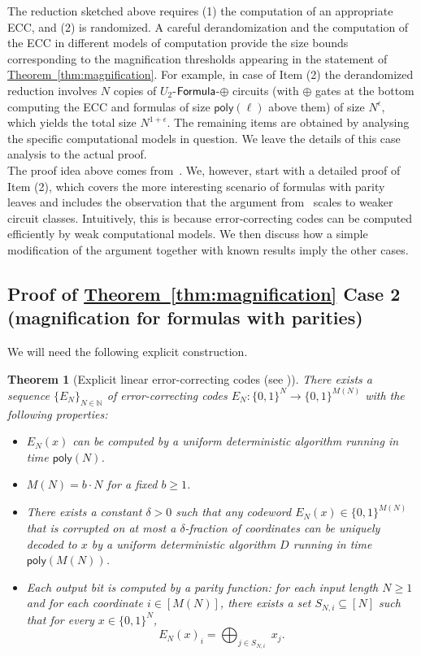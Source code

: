 \documentclass[11pt]{article}
\numberwithin{equation}{section}
\newtheorem{theorem}{Theorem}[section]
\theoremstyle{definition}
\theoremstyle{plain}
\newcommand{\expref}[2]{\hyperref[#2]{#1~\ref{#2}}}
\newcommand{\Formula}{\ensuremath{{\sf Formula}}\xspace}
\begin{document}
The reduction sketched above requires (1) the computation of an appropriate ECC, and (2) is randomized. A careful derandomization and the computation of the ECC in different models of computation provide the size bounds corresponding to the magnification thresholds appearing in the statement of \expref{Theorem}{thm:magnification}. For example, in case of Item (2) the derandomized reduction involves $N$ copies of $U_2$-$\Formula$-$\oplus$ circuits (with $\oplus$ gates at the bottom computing the ECC and formulas of size $\mathsf{poly}(\ell)$ above them) of size $N^{\epsilon}$, which yields the total size $N^{1+\epsilon}$. The remaining items are obtained by analysing the specific computational models in question. We leave the details of this case analysis to the actual proof.\\


The proof idea above comes from~\cite{OS18}. We, however, start with a detailed proof of Item (2), which covers the more interesting scenario of formulas with parity leaves and includes the observation that the argument from~\cite{OS18} scales to weaker circuit classes. Intuitively, this is because error-correcting codes can be computed efficiently by weak computational models. We then discuss how a simple modification of the argument together with known results imply the other cases.


\subsection{Proof of \expref{Theorem}{thm:magnification} Case 2 (magnification for formulas with parities)}\label{ss:magnification_formulas}

We will need the following explicit construction.

\begin{theorem}[Explicit linear error-correcting codes (see \cite{DBLP:journals/tit/Justesen72, DBLP:journals/tit/SipserS96})] \label{thm:code} There exists a sequence $\{E_N\}_{N \in \mathbb{N}}$ of error-correcting codes $E_N \colon \{0,1\}^N \to \{0,1\}^{M(N)}$ with the following properties:
\vspace{0.1cm}
\begin{itemize}
\item $E_N(x)$ can be computed by a uniform deterministic algorithm running in time $\mathsf{poly}(N)$.
\item $M(N) = b \cdot N$ for a fixed $b \geq 1$.
\item There exists a constant $\delta > 0$ such that any codeword $E_N(x) \in \{0,1\}^{M(N)}$ that is corrupted on at most a $\delta$-fraction of coordinates can be uniquely decoded to $x$ by a uniform deterministic algorithm $D$ running in time $\mathsf{poly}(M(N))$.
\item Each output bit is computed by a parity function: for each input length $N \geq 1$ and for each coordinate $i \in [M(N)]$, there exists a set $S_{N,i} \subseteq [N]$ such that for every $x \in \{0,1\}^N$, $$E_N(x)_i = \bigoplus_{j \in S_{N,i}} \;x_j.$$
\end{itemize}
\end{theorem}
\end{document}
